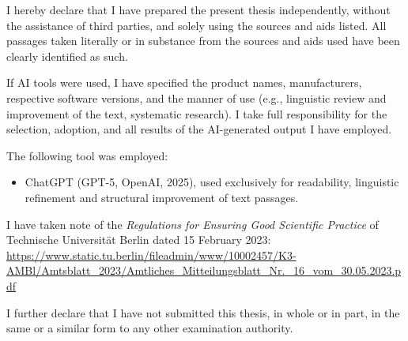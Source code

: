 \begin{erklaerung}
I hereby declare that I have prepared the present thesis independently, without the assistance of third parties, and solely using the sources and aids listed. All passages taken literally or in substance from the sources and aids used have been clearly identified as such.

If AI tools were used, I have specified the product names, manufacturers, respective software versions, and the manner of use (e.g., linguistic review and improvement of the text, systematic research). I take full responsibility for the selection, adoption, and all results of the AI-generated output I have employed.

The following tool was employed:

\begin{itemize}
    \item ChatGPT (GPT-5, OpenAI, 2025), used exclusively for readability, linguistic refinement and structural improvement of text passages.
\end{itemize}

I have taken note of the \textit{Regulations for Ensuring Good Scientific Practice} of Technische Universität Berlin dated 15 February 2023:\\
\href{https://www.static.tu.berlin/fileadmin/www/10002457/K3-AMBl/Amtsblatt_2023/Amtliches_Mitteilungsblatt_Nr._16_vom_30.05.2023.pdf}{https://www.static.tu.berlin/fileadmin/www/10002457/K3-\\AMBl/Amtsblatt\_2023/Amtliches\_Mitteilungsblatt\_Nr.\_16\_vom\_30.05.2023.pdf}

I further declare that I have not submitted this thesis, in whole or in part, in the same or a similar form to any other examination authority.
\end{erklaerung}